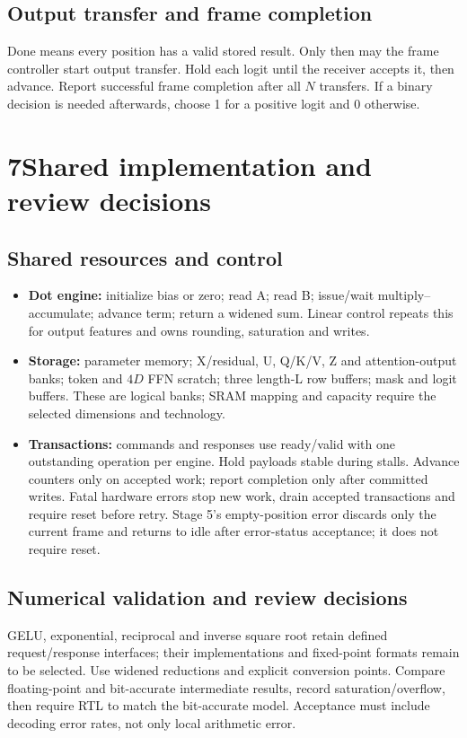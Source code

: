 \documentclass[11pt,a4paper]{article}
\begin{document}
\subsection*{Output transfer and frame completion}
Done means every position has a valid stored result. Only then may the frame controller start output transfer. Hold each logit until the receiver accepts it, then advance. Report successful frame completion after all $N$ transfers. If a binary decision is needed afterwards, choose 1 for a positive logit and 0 otherwise.

\newpage
\section*{7\quad Shared implementation and review decisions}
\subsection*{Shared resources and control}
\begin{itemize}
\item \textbf{Dot engine:} initialize bias or zero; read A; read B; issue/wait multiply--accumulate; advance term; return a widened sum. Linear control repeats this for output features and owns rounding, saturation and writes.
\item \textbf{Storage:} parameter memory; X/residual, U, Q/K/V, Z and attention-output banks; token and $4D$ FFN scratch; three length-L row buffers; mask and logit buffers. These are logical banks; SRAM mapping and capacity require the selected dimensions and technology.
\item \textbf{Transactions:} commands and responses use ready/valid with one outstanding operation per engine. Hold payloads stable during stalls. Advance counters only on accepted work; report completion only after committed writes. Fatal hardware errors stop new work, drain accepted transactions and require reset before retry. Stage 5's empty-position error discards only the current frame and returns to idle after error-status acceptance; it does not require reset.
\end{itemize}

\subsection*{Numerical validation and review decisions}
GELU, exponential, reciprocal and inverse square root retain defined request/response interfaces; their implementations and fixed-point formats remain to be selected. Use widened reductions and explicit conversion points. Compare floating-point and bit-accurate intermediate results, record saturation/overflow, then require RTL to match the bit-accurate model. Acceptance must include decoding error rates, not only local arithmetic error.
\end{document}
